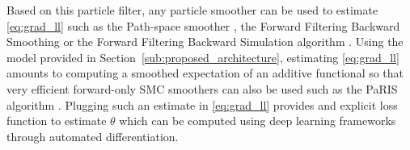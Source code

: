 \documentclass{article}
\begin{document}
Based on this particle filter, any particle smoother can be used to estimate \eqref{eq:grad_ll} such as the Path-space smoother \cite{Kitagawa1996}, the Forward Filtering Backward Smoothing \cite{Doucet2000OnSM} or the Forward Filtering Backward Simulation algorithm \cite{Godsill2004MonteCS}.
Using the model provided in Section~\ref{sub:proposed_architecture}, estimating \eqref{eq:grad_ll} amounts to computing a smoothed expectation of an additive functional so that very efficient forward-only SMC smoothers can also be used such as the PaRIS algorithm \cite{Olsson2014EfficientPO}.
Plugging such an estimate in \ref{eq:grad_ll} provides and explicit loss function to estimate $\theta$ which can be computed using deep learning frameworks through automated differentiation. %

\end{document}
